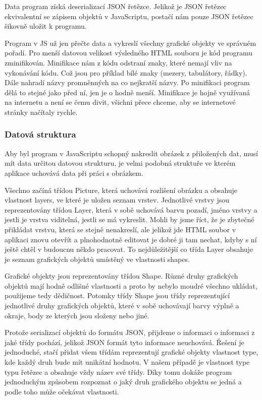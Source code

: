\documentclass[
  field=inf,
  biblatex,
  glossaries,
  index
]{kidiplom}
\begin{document}
Data program získá deserializací JSON řetězce. Jelikož je JSON řetězec ekvivalentní se zápisem objektů v JavaScriptu, postačí nám pouze JSON řetězec šikovně uložit k programu.

Program v JS už jen přečte data a vykreslí všechny grafické objekty ve správném pořadí. Pro menší datovou velikost výsledného HTML souboru je kód programu zminifikován. Minifikace nám z kódu odstraní znaky, které nemají vliv na vykonávání kódu. Což jsou pro příklad bílé znaky (mezery, tabulátory, řádky). Dále nahradí názvy promněnných na co nejkratší názvy. Po minifikaci program dělá to stejné jako před ní, jen je o hodně menší. Minifikace je hojně využívaná na internetu a není se čemu divit, všichni přece chceme, aby se internetové stránky načítaly rychle.

\subsubsection{Datová struktura}
Aby byl program v JavaScriptu schopný nakreslit obrázek z přiložených dat, musí mít data určitou datovou strukturu, je velmi podobná struktuře ve kterém aplikace uchovává data při práci s obrázkem.

Všechno začíná třídou Picture, která uchovává rozlišení obrázku a obsahuje vlastnost layers, ve které je uložen seznam vrstev. Jednotlivé vrstvy jsou reprezentovány třídou Layer, která v sobě uchovává barvu pozadí, jméno vrstvy a jestli je vrstva viditelná, jestli se má vykreslit. Mohli by jsme říct, že je zbytečné přikládat vrstvu, která se stejně nenakreslí, ale jelikož jde HTML soubor v aplikaci znovu otevřít a plnohodnotně editovat je dobré ji tam nechat, kdyby s ní ještě chtěl v budoucnu někdo pracovat. To nejdůležitější co třída Layer obsahuje je seznam grafických objektů  umístěný ve vlastnosti shapes.

Grafické objekty jsou reprezentovány třídou Shape. Různé druhy grafických objektů mají hodně odlišné vlastnosti a proto by nebylo moudré všechno ukládat, použijeme tedy dědičnost. Potomky třídy Shape jsou třídy reprezentující jednotlivé druhy grafických objektů, které v sobě uchovávají barvy výplně a okraje, body ze kterých jsou složeny nebo jiné.

Protože serializací objektů do formátu JSON, přijdeme o informaci o informaci z jaké třídy pochází, jelikož JSON formát tyto informace neuchovává. Řešení je jednoduché, stačí přidat všem třídám reprezentují grafické objekty vlastnost type, kde každý druh bude mít unikátní hodnotu. V našem případě je vlastnost type typu řetězec a obsahuje vždy název své třídy. Díky tomu dokáže program jednoduchým způsobem rozpoznat o jaký druh grafického objektu se jedná a podle toho může očekávat vlastnosti.
\end{document}
